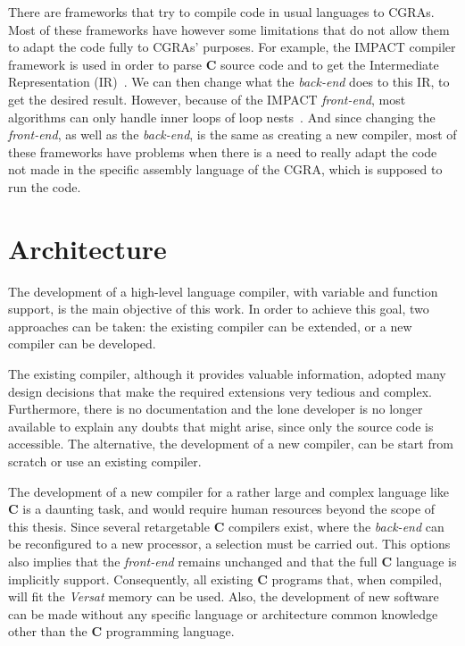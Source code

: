 \documentclass[journal]{IEEEtran}
\begin{document}
There are frameworks that try to compile code in usual languages to {\sc CGRAs}.
Most of these frameworks have however some limitations that do not allow them to
adapt the code fully to {\sc CGRAs}' purposes.  For example, the {\sc IMPACT}
compiler framework is used in order to parse {\bf C} source code and to get the
Intermediate Representation ({\sc IR})~\cite{Mei03}.  We can then change what
the {\it back-end} does to this {\sc IR}, to get the desired result.  However,
because of the {\sc IMPACT} {\it front-end}, most algorithms can only handle
inner loops of loop nests~\cite{Mei03}.  And since changing the {\it front-end},
as well as the {\it back-end}, is the same as creating a new compiler, most of
these frameworks have problems when there is a need to really adapt the code not
made in the specific assembly language of the {\sc CGRA}, which is supposed to run the
code.


\section{Architecture}

The development of a high-level language compiler, with variable and function
support, is the main objective of this work.  In order to achieve this goal, two
approaches can be taken: the existing compiler can be extended, or a new
compiler can be developed.

The existing compiler, although it provides valuable information, adopted many
design decisions that make the required extensions very tedious and complex.
Furthermore, there is no documentation and the lone developer is no longer
available to explain any doubts that might arise, since only the source code is
accessible.  The alternative, the development of a new compiler, can be start
from scratch or use an existing compiler.

The development of a new compiler for a rather large and complex language like
{\bf C} is a daunting task, and would require human resources beyond the scope of
this thesis.  Since several retargetable {\bf C} compilers exist, where the
{\it back-end} can be reconfigured to a new processor, a selection must be carried
out.  This options also implies that the {\it front-end} remains unchanged and that
the full {\bf C} language is implicitly support.  Consequently, all existing
{\bf C} programs that, when compiled, will fit the {\it Versat} memory can be
used.  Also, the development of new software can be made without any specific
language or architecture common knowledge other than the {\bf C} programming
language.
\end{document}
